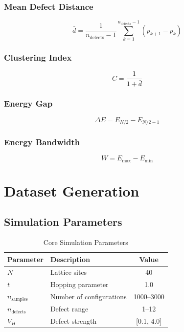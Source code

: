 \documentclass[11pt,a4paper]{article}
\begin{document}
\subsubsection{Mean Defect Distance}
\begin{equation}
\bar{d} = \frac{1}{n_{\text{defects}}-1} \sum_{k=1}^{n_{\text{defects}}-1} (p_{k+1} - p_k)
\end{equation}

\subsubsection{Clustering Index}
\begin{equation}
C = \frac{1}{1 + \bar{d}}
\end{equation}

\subsubsection{Energy Gap}
\begin{equation}
\Delta E = E_{N/2} - E_{N/2-1}
\end{equation}

\subsubsection{Energy Bandwidth}
\begin{equation}
W = E_{\max} - E_{\min}
\end{equation}

\newpage
\section{Dataset Generation}

\subsection{Simulation Parameters}

\begin{table}[h]
\centering
\caption{Core Simulation Parameters}
\begin{tabular}{l l c}
\toprule
Parameter & Description & Value \\
\midrule
$N$ & Lattice sites & 40 \\
$t$ & Hopping parameter & 1.0 \\
$n_{\text{samples}}$ & Number of configurations & 1000--3000 \\
$n_{\text{defects}}$ & Defect range & 1--12 \\
$V_H$ & Defect strength & [0.1, 4.0] \\
\bottomrule
\end{tabular}
\end{table}
\end{document}
